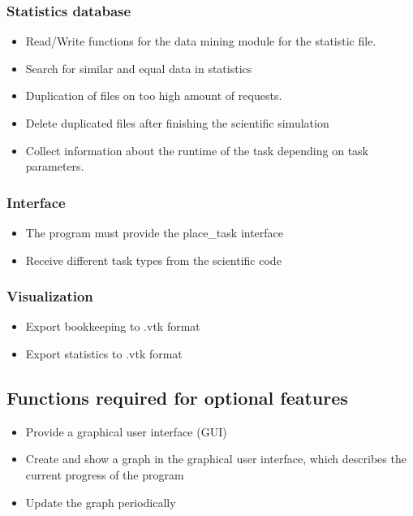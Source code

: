 {		\subsubsection{Statistics database}
	
			\begin{itemize}
				\item Read/Write functions for the data mining module for the statistic file.
				\item Search for similar and equal data in statistics
				\item Duplication of files on too high amount of requests.
				\item Delete duplicated files after finishing the scientific simulation
				\item Collect information about the runtime of the task depending on task parameters.
			\end{itemize}
	
	
	\subsubsection{Interface}
		\begin{itemize}
		
			\item The program must provide the place\_task interface
			\item Receive different task types from the scientific code
		\end{itemize}
		
		
	\subsubsection{Visualization}
	
		\begin{itemize}
			\item Export bookkeeping to .vtk format
			\item Export statistics to .vtk format
		\end{itemize}
		
	\subsection{Functions required for optional features}
	
		\begin{itemize}
			\item Provide a graphical user interface (GUI)
			\item Create and show a graph in the graphical user interface, which describes the current progress of the program
			\item Update the graph periodically
					
		
		\end{itemize}
		
}
